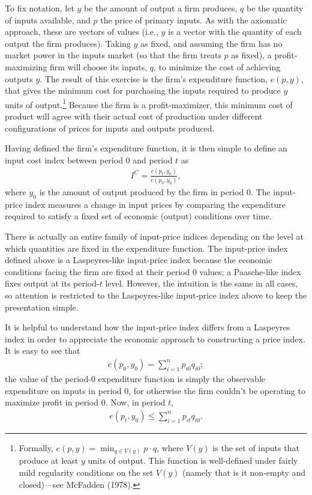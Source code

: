 \documentclass[
]{article}
\begin{document}
To fix notation, let \(y\) be the amount of output a firm produces, \(q\) be the quantity of inputs available, and \(p\) the price of primary inputs. As with the axiomatic approach, these are vectors of values (i.e., \(y\) is a vector with the quantity of each output the firm produces). Taking \(y\) as fixed, and assuming the firm has no market power in the inputs market (so that the firm treats \(p\) as fixed), a profit-maximizing firm will choose its inputs, \(q\), to minimize the cost of achieving outputs \(y\). The result of this exercise is the firm's expenditure function, \(e(p, y)\), that gives the minimum cost for purchasing the inputs required to produce \(y\) units of output.\footnote{Formally, \(e(p, y) = \min_{q \in V(y)} p \cdot q\), where \(V(y)\) is the set of inputs that produce at least \(y\) units of output. This function is well-defined under fairly mild regularity conditions on the set \(V(y)\) (namely that is it non-empty and closed)---see McFadden (1978).} Because the firm is a profit-maximizer, this minimum cost of product will agree with their actual cost of production under different configurations of prices for inputs and outputs produced.

Having defined the firm's expenditure function, it is then simple to define an input cost index between period 0 and period \(t\) as
\begin{align*}
I^{C} = \frac{e(p_{t}, y_{0})}{e(p_{0}, y_{0})},
\end{align*}
where \(y_{0}\) is the amount of output produced by the firm in period 0. The input-price index measures a change in input prices by comparing the expenditure required to satisfy a fixed set of economic (output) conditions over time.

There is actually an entire family of input-price indices depending on the level at which quantities are fixed in the expenditure function. The input-price index defined above is a Laspeyres-like input-price index because the economic conditions facing the firm are fixed at their period 0 values; a Paasche-like index fixes output at its period-\(t\) level. However, the intuition is the same in all cases, so attention is restricted to the Laspeyres-like input-price index above to keep the presentation simple.

It is helpful to understand how the input-price index differs from a Laspeyres index in order to appreciate the economic approach to constructing a price index. It is easy to see that
\begin{align*}
e(p_{0}, y_{0}) = \sum_{i = 1}^{n} p_{i0} q_{i0};
\end{align*}
the value of the period-0 expenditure function is simply the observable expenditure on inputs in period 0, for otherwise the firm couldn't be operating to maximize profit in period 0. Now, in period \(t\),
\begin{align*}
e(p_{t}, y_{0}) \leq \sum_{i = 1}^{n} p_{it} q_{i0}.
\end{align*}
\end{document}
